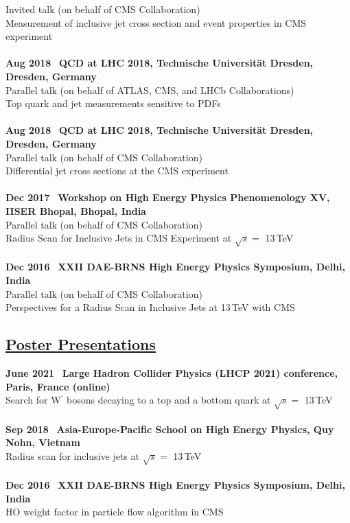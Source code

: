 \documentclass[a4paper,11pt]{article}
\begin{document}
{Invited talk (on behalf of CMS Collaboration) \\
Measurement of inclusive jet cross section and event properties in CMS experiment \\
\\
\textbf{Aug 2018} \ \textbf{QCD at LHC 2018, Technische Universit{\"a}t Dresden, Dresden, Germany} \\
Parallel talk (on behalf of ATLAS, CMS, and LHCb Collaborations) \\
Top quark and jet measurements sensitive to PDFs  \\
\\
\textbf{Aug 2018} \ \textbf{QCD at LHC 2018, Technische Universit{\"a}t Dresden, Dresden, Germany} \\
Parallel talk (on behalf of CMS Collaboration) \\
Differential jet cross sections at the CMS experiment \\
\\
\textbf{Dec 2017} \ \textbf{Workshop on High Energy Physics Phenomenology XV, IISER Bhopal, Bhopal, India} \\
Parallel talk (on behalf of CMS Collaboration)\\
Radius Scan for Inclusive Jets in CMS Experiment at $\sqrt{s} =$ 13\,TeV \\
\\
\textbf{Dec 2016} \ \textbf{XXII DAE-BRNS High Energy Physics Symposium, Delhi, India} \\
Parallel talk (on behalf of CMS Collaboration) \\
Perspectives for a Radius Scan in Inclusive Jets at 13\,TeV with CMS  \\

\subsection*{\underline{Poster Presentations}}

\textbf{June 2021} \ \textbf{Large Hadron Collider Physics (LHCP 2021) conference, Paris, France (online)}\\
Search for W$^{\prime}$ bosons decaying to a top and a bottom quark at $\sqrt{s}=$ 13\,TeV\\
\\
\textbf{Sep 2018} \ \textbf{Asia-Europe-Pacific School on High Energy Physics, Quy Nohn, Vietnam}\\
Radius scan for inclusive jets at $\sqrt{s}=$ 13\,TeV\\
\\
\textbf{Dec 2016} \ \textbf{XXII DAE-BRNS High Energy Physics Symposium, Delhi, India}\\
HO weight factor in particle flow algorithm in CMS\\

}
\end{document}
